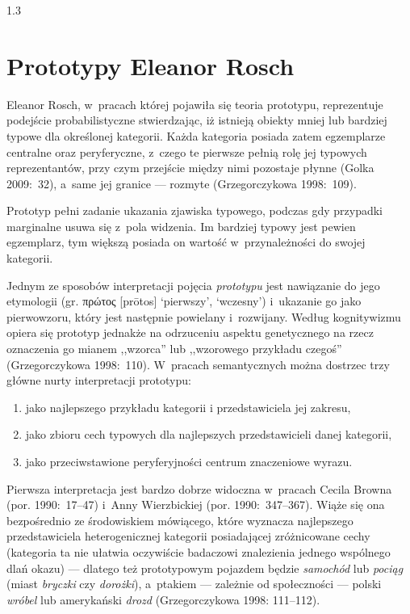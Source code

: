 \documentclass[11pt,a4paper,twoside]{report}
\begin{document}
\begin{spacing}{1.3}

\section{Prototypy Eleanor Rosch}

Eleanor Rosch, w~pracach której pojawiła się teoria prototypu, reprezentuje podejście probabilistyczne stwierdzając, iż istnieją obiekty mniej lub bardziej typowe dla określonej kategorii. Każda kategoria posiada zatem egzemplarze centralne oraz peryferyczne, z~czego te pierwsze pełnią rolę jej typowych reprezentantów, przy czym przejście między nimi pozostaje płynne (Golka 2009:~32), a~same jej granice --- rozmyte (Grzegorczykowa 1998:~109).

\newpage

Prototyp pełni zadanie ukazania zjawiska typowego, podczas gdy przypadki marginalne usuwa się z~pola widzenia. Im bardziej typowy jest pewien egzemplarz, tym większą posiada on wartość w~przynależności do swojej kategorii.

Jednym ze sposobów interpretacji pojęcia \emph{prototypu} jest nawiązanie do jego etymologii (gr. \textgreek{πρώτος} [pr\={o}tos] ‘pierwszy’, ‘wczesny’) i~ukazanie go jako pierwowzoru, który jest następnie powielany i~rozwijany. Według kognitywizmu opiera się prototyp jednakże na odrzuceniu aspektu genetycznego na rzecz oznaczenia go mianem ,,wzorca'' lub ,,wzorowego przykładu czegoś'' (Grzegorczykowa 1998:~110). W~pracach semantycznych można dostrzec trzy główne nurty interpretacji prototypu:\\
\begin{enumerate}[1)]
  \item jako najlepszego przykładu kategorii i przedstawiciela jej zakresu,
  \item jako zbioru cech typowych dla najlepszych przedstawicieli danej kategorii,
  \item jako przeciwstawione peryferyjności centrum znaczeniowe wyrazu.\\
\end{enumerate}

Pierwsza interpretacja jest bardzo dobrze widoczna w~pracach Cecila Browna \linebreak (por. 1990:~17--47) i~Anny Wierzbickiej (por. 1990:~347--367). Wiąże się ona bezpośrednio ze środowiskiem mówiącego, które wyznacza najlepszego przedstawiciela heterogenicznej kategorii posiadającej zróżnicowane cechy (kategoria ta nie ułatwia oczywiście badaczowi znalezienia jednego wspólnego dlań okazu) --- dlatego też prototypowym pojazdem będzie \emph{samochód} lub \emph{pociąg} (miast \emph{bryczki} czy \emph{dorożki}), a~ptakiem --- zależnie od społeczności --- polski \emph{wróbel} lub amerykański \emph{drozd} (Grzegorczykowa 1998: 111--112).


\end{spacing}
\end{document}

